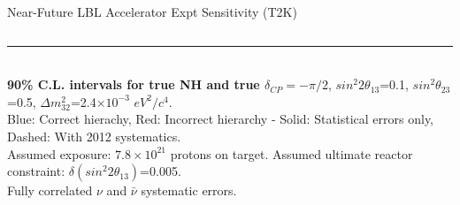 \begin{frame}{Near-Future LBL Accelerator Expt Sensitivity (T2K)}
\begin{columns}[T]
\begin{column}{0.36\textwidth}
{\begin{itemize}
     \end{itemize}
    }
  \end{column}
\end{columns}
\noindent\rule{2cm}{0.4pt}\\
{\tiny
  {\bf 90\% C.L. intervals for true NH and true $\delta_{CP}=-\pi/2$},
   $sin^{2}2{\theta}_{13}$=0.1, $sin^{2}{\theta}_{23}$=0.5, ${\Delta}m^{2}_{32}$=2.4$\times10^{-3}$ $eV^{2}/c^{4}$.\\
   Blue: Correct hierachy, Red: Incorrect hierarchy -
   Solid: Statistical errors only, Dashed: With 2012 systematics.\\
   Assumed exposure: $7.8\times10^{21}$ protons on target.
   Assumed ultimate reactor constraint: $\delta(sin^{2}2{\theta}_{13})$=0.005.\\
   Fully correlated $\nu$ and $\bar{\nu}$ systematic errors.\\
}
\end{frame}


